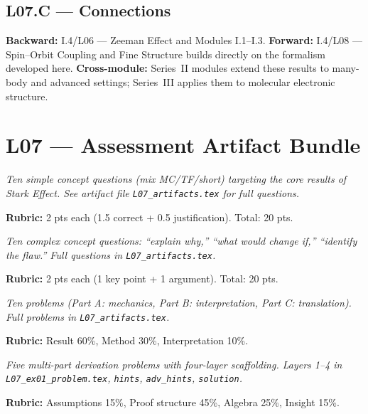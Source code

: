 \subsection*{L07.C — Connections}
\label{sec:L07.C}
\textbf{Backward:} I.4/L06 — Zeeman Effect and Modules I.1–I.3.
\textbf{Forward:} I.4/L08 — Spin–Orbit Coupling and Fine Structure builds directly on the formalism developed here.
\textbf{Cross-module:} Series~II modules extend these results to many-body and
advanced settings; Series~III applies them to molecular electronic structure.

\newpage
\section*{L07 — Assessment Artifact Bundle}

\begin{tcolorbox}[ugconceptbox, title={SCQU · L07 · Tiers 1–3 · 15–20 min}]
\textit{Ten simple concept questions (mix MC/TF/short) targeting the core results
of Stark Effect. See artifact file \texttt{L07_artifacts.tex} for full questions.}

\textbf{Rubric:} 2 pts each (1.5 correct + 0.5 justification). Total: 20 pts.
\end{tcolorbox}

\begin{tcolorbox}[ugconceptbox, title={CCQU · L07 · Tiers 2–3 · 25–35 min}]
\textit{Ten complex concept questions: ``explain why,'' ``what would change if,''
``identify the flaw.'' Full questions in \texttt{L07_artifacts.tex}.}

\textbf{Rubric:} 2 pts each (1 key point + 1 argument). Total: 20 pts.
\end{tcolorbox}

\begin{tcolorbox}[ugprobbox, title={SPSU · L07 · Tiers 1–3 · 60–90 min}]
\textit{Ten problems (Part A: mechanics, Part B: interpretation, Part C: translation).
Full problems in \texttt{L07_artifacts.tex}.}

\textbf{Rubric:} Result 60\%, Method 30\%, Interpretation 10\%.
\end{tcolorbox}

\begin{tcolorbox}[ugprobbox, title={CPSU · L07 · Tier 3 · 3–6 hrs (4-layer)}]
\textit{Five multi-part derivation problems with four-layer scaffolding.
Layers 1–4 in \texttt{L07_ex01\_problem.tex}, \texttt{hints}, \texttt{adv\_hints}, \texttt{solution}.}

\textbf{Rubric:} Assumptions 15\%, Proof structure 45\%, Algebra 25\%, Insight 15\%.
\end{tcolorbox}

